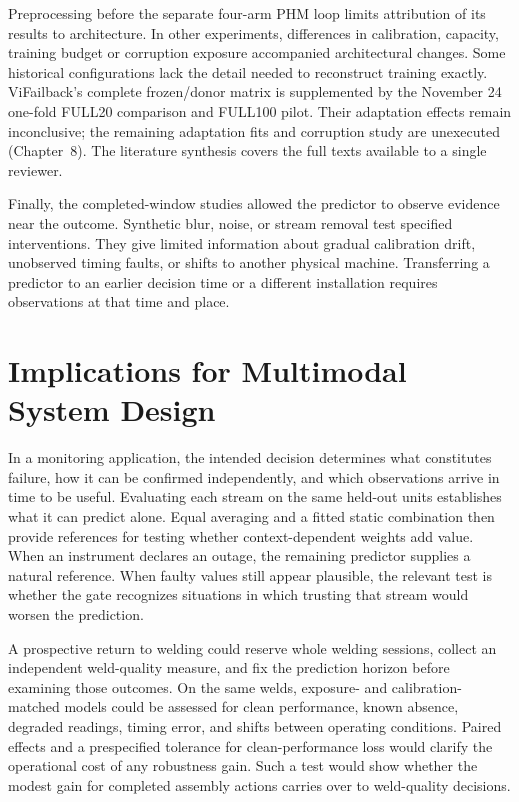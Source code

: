 Preprocessing before the separate four-arm PHM loop limits attribution of its results to
architecture. In other experiments, differences in calibration, capacity, training
budget or corruption exposure accompanied architectural changes. Some historical
configurations lack the detail needed to reconstruct training exactly. ViFailback's
complete frozen/donor matrix is supplemented by the November 24 one-fold FULL20
comparison and FULL100 pilot. Their adaptation effects remain inconclusive; the
remaining adaptation fits and corruption study are unexecuted (Chapter~8). The
literature synthesis covers the full texts available to a single reviewer.

Finally, the completed-window studies allowed the predictor to observe evidence near the
outcome. Synthetic blur, noise, or stream removal test specified interventions. They
give limited information about gradual calibration drift, unobserved timing faults, or
shifts to another physical machine. Transferring a predictor to an earlier decision time
or a different installation requires observations at that time and place.

\section{Implications for Multimodal System Design}
In a monitoring application, the intended decision determines what constitutes failure,
how it can be confirmed independently, and which observations arrive in time to be
useful. Evaluating each stream on the same held-out units establishes what it can
predict alone. Equal averaging and a fitted static combination then provide references
for testing whether context-dependent weights add value. When an instrument declares an
outage, the remaining predictor supplies a natural reference. When faulty values still
appear plausible, the relevant test is whether the gate recognizes situations in which
trusting that stream would worsen the prediction.

A prospective return to welding could reserve whole welding sessions, collect an
independent weld-quality measure, and fix the prediction horizon before examining those
outcomes. On the same welds, exposure- and calibration-matched models could be assessed
for clean performance, known absence, degraded readings, timing error, and shifts
between operating conditions. Paired effects and a prespecified tolerance for
clean-performance loss would clarify the operational cost of any robustness gain. Such a
test would show whether the modest gain for completed assembly actions carries over to
weld-quality decisions.
